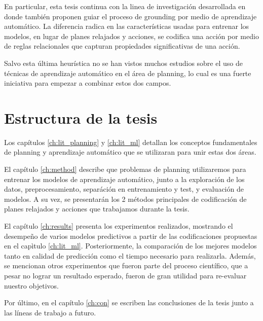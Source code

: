 En particular, esta tesis continua con la linea de investigación desarrollada en
\citep{Gnad_Torralba_Dominguez_Areces_Bustos_2019} donde también proponen guiar
el proceso de grounding por medio de aprendizaje automático. La diferencia
radica en las características usadas para entrenar los modelos, en lugar de
planes relajados y acciones, se codifica una acción por medio de reglas
relacionales que capturan propiedades significativas de una acción.

Salvo esta última heurística no se han vistos muchos estudios sobre el uso de
técnicas de aprendizaje automático en el área de planning, lo cual es una fuerte
iniciativa para empezar a combinar estos dos campos.

\section{Estructura de la tesis}

Los capítulos \ref{ch:lit_planning} y \ref{ch:lit_ml} detallan los conceptos
fundamentales de planning y aprendizaje automático que se utilizaran para unir
estas dos áreas.

El capítulo \ref{ch:method} describe que problemas de planning utilizaremos para
entrenar los modelos de aprendizaje automático, junto a la exploración de los
datos, preprocesamiento, separáción en entrenamiento y test, y evaluación de
modelos. A su vez, se presentarán los 2 métodos principales de codificación de
planes relajados y acciones que trabajamos durante la tesis.

El capítulo \ref{ch:results} presenta los experimentos realizados, mostrando el
desempeño de varios modelos predictivos a partir de las codificaciones
propuestas en el capìtulo \ref{ch:lit_ml}. Posteriormente, la comparación de los
mejores modelos tanto en calidad de predicción como el tiempo necesario para
realizarla. Además, se mencionan otros experimentos que fueron parte del proceso
científico, que a pesar no lograr un resultado esperado, fueron de gran utilidad
para re-evaluar nuestro objetivos.

Por último, en el capítulo \ref{ch:con} se escriben las conclusiones de la tesis
junto a las líneas de trabajo a futuro.
